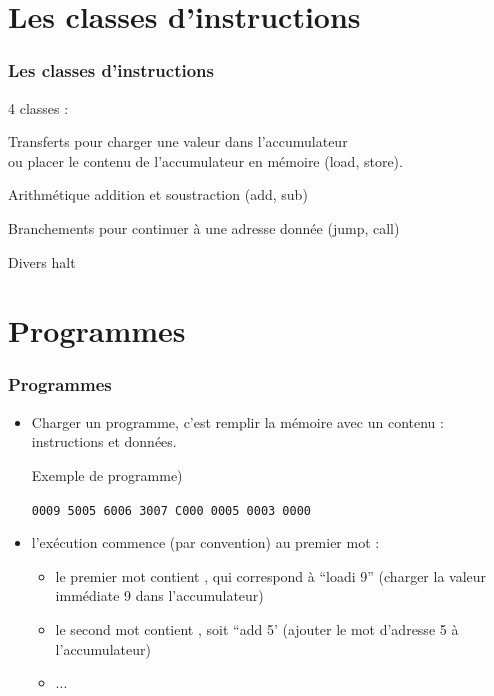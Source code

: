\section{Les classes d'instructions}
\begin{frame}
\frametitle{Les classes d'instructions}


 4  classes :
\begin{block}{Transferts}
pour charger une valeur dans l'accumulateur \\
ou placer le contenu de l'accumulateur en mémoire (\alert{load, store}).
\end{block}

\begin{block}{Arithmétique} addition  et soustraction  (\alert{add, sub})
\end{block}

\begin{block}{Branchements} 
pour continuer à une adresse donnée (\alert{jump, call})
\end{block}
\begin{block}{Divers} 
\alert{halt}
\end{block}

\end{frame}

\section{Programmes}
\begin{frame}
  \frametitle{Programmes}

\begin{itemize}
\item 
\alert{Charger un programme}, c'est remplir la mémoire avec un contenu : instructions et données.

\begin{block}{Exemple de programme)}
  
\texttt{0009 5005 6006 3007 C000 0005 0003 0000}
\end{block}
\item \alert{l'exécution} commence (par convention) au premier mot :
\begin{itemize}
\item le premier mot contient , qui correspond à ``loadi 9'' (charger la valeur immédiate 9 dans l'accumulateur)
\item le second mot contient , soit ``add 5' (ajouter le mot d'adresse 5 à l'accumulateur)
\item ...
\end{itemize}
\end{itemize}
\end{frame}


